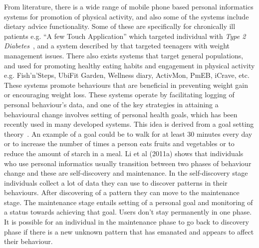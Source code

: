 From literature, there is a wide range of mobile phone based personal informatics systems for promotion of physical activity, and also some of the systems include dietary advice functionality. Some of these are specifically for chronically ill patients e.g. ``A few Touch Application'' which targeted individual with  \emph{Type 2 Diabetes}~\citep{arsand:mobile}, and a system described by \cite{arteaga2010:persuasive} that targeted teenagers with weight management issues. There also exists systems that target general populations, and used for promoting healthy eating habits and engagement in physical activity e.g. Fish'n'Steps\citep{lin2006:fish}, UbiFit Garden\citep{klasnja2009:using}, Wellness diary\citep{mattila2008mobile}, ActivMon\citep{burns2012using}, PmEB\citep{lee2006pmeb}, iCrave\citep{hsu2014persuasive}, etc.  These systems promote behaviours that are beneficial in preventing weight gain or encouraging weight loss. These systems operate by facilitating logging of personal behaviour’s data, and one of the key strategies in attaining a behavioural change involves setting of personal health goals, which has been recently used in many developed systems. This idea is derived from a goal setting theory~\citep{strecher1995goal}. An example of a goal could be to walk for at least 30 minutes every day or to increase the number of times a person eats fruits and vegetables or to reduce the amount of starch in a meal. Li et al (2011a) shows that individuals who use personal informatics usually transition between two phases of behaviour change and these are self-discovery and maintenance. In the self-discovery stage individuals collect a lot of data they can use to discover patterns in their behaviours. After discovering of a pattern they can move to the maintenance stage. The maintenance stage entails setting of a personal goal and monitoring of a status towards achieving that goal. Users don't stay permanently in one phase. It is possible for an individual in the maintenance phase to go back to discovery phase if there is a new unknown pattern that has emanated and appears to affect their behaviour.

